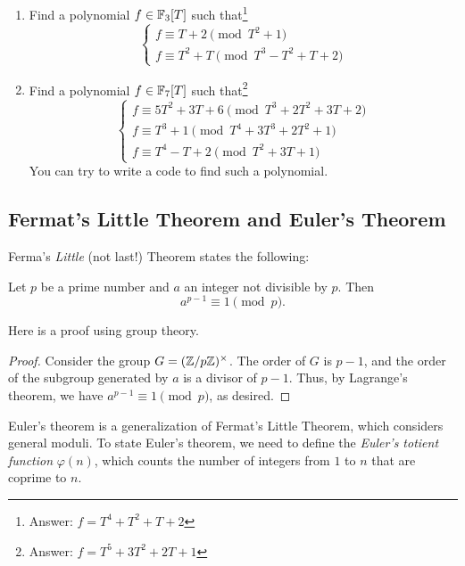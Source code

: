 \begin{exercise}
    \begin{enumerate}
        \item Find a polynomial $f \in \mathbb{F}_3[T]$ such that\footnote{Answer: $f = T^4 + T^2 + T + 2$}
        \[
        \begin{cases}
            f \equiv T + 2 \pmod{T^2 + 1} \\
            f \equiv T^2 + T \pmod{T^3 - T^2 +  T + 2}
        \end{cases} 
        \]
        \item Find a polynomial $f \in \mathbb{F}_{7}[T]$ such that\footnote{Answer: $f = T^5 + 3T^2 + 2T + 1$}
        \[
        \begin{cases}
            f \equiv 5T^2 + 3T + 6 \pmod{T^3 + 2T^2 + 3T + 2} \\
            f \equiv T^3 + 1 \pmod{T^4 + 3T^3 + 2T^2 + 1} \\
            f \equiv T^4 - T + 2 \pmod{T^2 + 3T + 1}
        \end{cases} 
        \]
        You can try to write a code to find such a polynomial.
    \end{enumerate}
\end{exercise}

\subsection{Fermat's Little Theorem and Euler's Theorem}
\label{subsec:basicnt_flittlet}

Ferma's \emph{Little} (not last!) Theorem states the following:
\begin{theorem}
    \label{thm:fermat_little}
    Let $p$ be a prime number and $a$ an integer not divisible by $p$.
    Then
    \[
        a^{p - 1} \equiv 1 \pmod{p}.
    \]
\end{theorem}

Here is a proof using group theory.

\begin{proof}
    Consider the group $G = (\mathbb{Z} / p\mathbb{Z})^\times$.
    The order of $G$ is $p - 1$, and the order of the subgroup generated by $a$ is a divisor of $p - 1$.
    Thus, by Lagrange's theorem, we have $a^{p - 1} \equiv 1 \pmod{p}$, as desired.
\end{proof}

Euler's theorem is a generalization of Fermat's Little Theorem, which considers general moduli.
To state Euler's theorem, we need to define the \emph{Euler's totient function} $\varphi(n)$, which counts the number of integers from $1$ to $n$ that are coprime to $n$.

